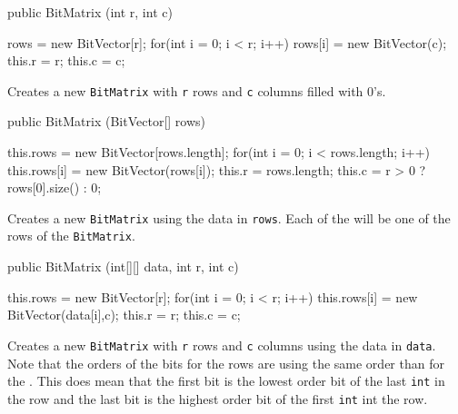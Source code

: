 \begin{code}
   public BitMatrix (int r, int c) \begin{hide} {
      rows = new BitVector[r];
      for(int i = 0; i < r; i++)
         rows[i] = new BitVector(c);
      this.r = r;
      this.c = c;
   } \end{hide}
\end{code}
\begin{tabb} Creates a new \texttt{BitMatrix} with \texttt{r} rows and
  \texttt{c} columns filled with 0's.
\end{tabb}
\begin{htmlonly}
\end{htmlonly}
\begin{code}

   public BitMatrix (BitVector[] rows) \begin{hide} {
      this.rows = new BitVector[rows.length];
      for(int i = 0; i < rows.length; i++)
         this.rows[i] = new BitVector(rows[i]);
      this.r = rows.length;
      this.c = r > 0 ? rows[0].size() : 0;
   } \end{hide}
\end{code}
\begin{tabb} Creates a new \texttt{BitMatrix} using the data in \texttt{rows}.
  Each of the  will be one of the rows of the
  \texttt{BitMatrix}.
\end{tabb}
\begin{htmlonly}
\end{htmlonly}
\begin{code}

   public BitMatrix (int[][] data, int r, int c) \begin{hide} {
      this.rows = new BitVector[r];
      for(int i = 0; i < r; i++)
         this.rows[i] = new BitVector(data[i],c);
      this.r = r;
      this.c = c;
   } \end{hide}
\end{code}
\begin{tabb} Creates a new \texttt{BitMatrix} with \texttt{r} rows and \texttt{c}
  columns using the data in \texttt{data}. Note that the orders of the
  bits for the rows are using the same order than for the .
  This does mean that the first bit is the lowest order bit of the last
  \texttt{int} in the row and the last bit is the highest order bit of the
  first \texttt{int} int the row.
\end{tabb}
